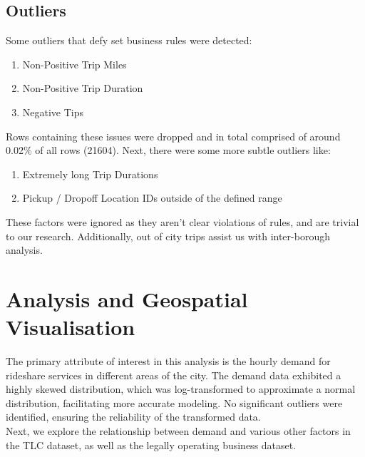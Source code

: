 \documentclass[11pt]{article}
\begin{document}
\subsection{Outliers}
Some outliers that defy set business rules were detected:
\begin{enumerate} 
    \item Non-Positive Trip Miles
    \item Non-Positive Trip Duration
    \item Negative Tips
\end{enumerate}
Rows containing these issues were dropped and in total comprised of around 0.02\% of all rows (21604).
Next, there were some more subtle outliers like:
\begin{enumerate} 
    \item Extremely long Trip Durations
    \item Pickup / Dropoff Location IDs outside of the defined range
\end{enumerate}
These factors were ignored as they aren’t clear violations of rules, and are trivial to our research. Additionally, out of city trips assist us with inter-borough analysis.

\section{Analysis and Geospatial Visualisation}
The primary attribute of interest in this analysis is the hourly demand for rideshare services in different areas of the city. The demand data exhibited a highly skewed distribution, which was log-transformed to approximate a normal distribution, facilitating more accurate modeling. No significant outliers were identified, ensuring the reliability of the transformed data.\\

Next, we explore the relationship between demand and various other factors in the TLC dataset, as well as the legally operating business dataset.
\end{document}

